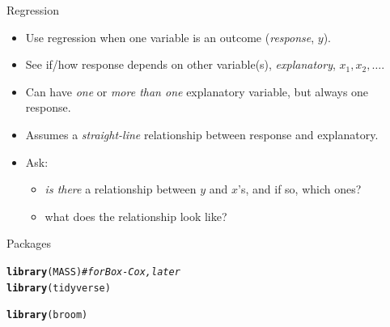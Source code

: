 \documentclass[unknownkeysallowed]{beamer}\usepackage[]{graphicx}\usepackage[]{color}
\makeatletter
\newcommand{\hlcom}[1]{\textcolor[rgb]{0.678,0.584,0.686}{\textit{#1}}}%
\newcommand{\hlstd}[1]{\textcolor[rgb]{0.345,0.345,0.345}{#1}}%
\newcommand{\hlkwd}[1]{\textcolor[rgb]{0.737,0.353,0.396}{\textbf{#1}}}%
\newenvironment{kframe}{%
 \def\at@end@of@kframe{}%
 \ifinner\ifhmode%
  \def\at@end@of@kframe{\end{minipage}}%
  \begin{minipage}{\columnwidth}%
 \fi\fi%
 \def\FrameCommand##1{\hskip\@totalleftmargin \hskip-\fboxsep
 \colorbox{shadecolor}{##1}\hskip-\fboxsep
     \hskip-\linewidth \hskip-\@totalleftmargin \hskip\columnwidth}%
 \MakeFramed {\advance\hsize-\width
   \@totalleftmargin\z@ \linewidth\hsize
   \@setminipage}}%
 {\par\unskip\endMakeFramed%
 \at@end@of@kframe}
\newenvironment{knitrout}{}{} %
\makeatother
\begin{document}
\begin{frame}{Regression}

  \begin{itemize}
  \item Use regression when one variable is an outcome ({\em response}, $y$).
  \item See if/how response depends on other variable(s), {\em explanatory}, $x_1, x_2,\ldots$.
  \item Can have {\em one} or {\em more than one} explanatory variable, but always one response.
  \item Assumes a {\em straight-line} relationship between response and explanatory.
  \item Ask: 
    \begin{itemize}
    \item {\em is there} a relationship between $y$ and $x$'s, and if so, which ones?
    \item what does the relationship look like?
    \end{itemize}

  \end{itemize}
  
\end{frame}

\begin{frame}[fragile]{Packages}
  
\begin{knitrout}
\color{fgcolor}\begin{kframe}
\begin{alltt}
\hlkwd{library}\hlstd{(MASS)} \hlcom{# for Box-Cox, later}
\hlkwd{library}\hlstd{(tidyverse)}
\end{alltt}


{\ttfamily\noindent\itshape\color{messagecolor}{\#\# -- Attaching packages ---------------------------------- tidyverse 1.2.1 --}}

{\ttfamily\noindent\itshape\color{messagecolor}{\#\# v ggplot2 3.1.0\ \ \ \  v purrr\ \  0.2.5\\\#\# v tibble\ \ 1.4.2\ \ \ \  v dplyr\ \  0.7.8\\\#\# v tidyr\ \  0.8.1\ \ \ \  v stringr 1.3.1\\\#\# v readr\ \  1.1.1\ \ \ \  v forcats 0.3.0}}

{\ttfamily\noindent\itshape\color{messagecolor}{\#\# -- Conflicts ------------------------------------- tidyverse\_conflicts() --\\\#\# x dplyr::filter() masks stats::filter()\\\#\# x dplyr::lag()\ \ \ \ masks stats::lag()\\\#\# x dplyr::select() masks MASS::select()}}\begin{alltt}
\hlkwd{library}\hlstd{(broom)}
\end{alltt}
\end{kframe}
\end{knitrout}
  
\end{frame}
\end{document}

